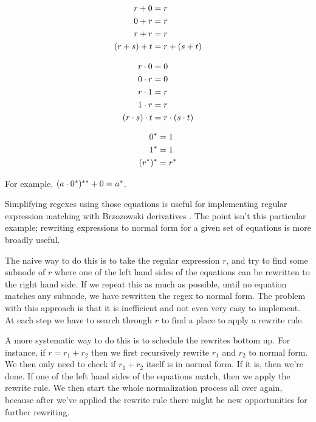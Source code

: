 \begin{minipage}[t]{0.3\textwidth}
  \begin{align*}
    r + 0 &= r \\
    0 + r &= r \\
    r + r &= r \\
    (r + s) + t &= r + (s + t) \\
  \end{align*}
\end{minipage}
\begin{minipage}[t]{0.3\textwidth}
  \begin{align*}
    r \cdot 0 &= 0 \\
    0 \cdot r &= 0 \\
    r \cdot 1 &= r \\
    1 \cdot r &= r \\
    (r \cdot s) \cdot t &= r \cdot (s \cdot t) \\
  \end{align*}
\end{minipage}
\begin{minipage}[t]{0.3\textwidth}
  \begin{align*}
    0^* &= 1 \\
    1^* &= 1 \\
    (r^*)^* &= r^*
  \end{align*}
\end{minipage}

For example, $(a \cdot 0^*)^{**} + 0 = a^*$.

Simplifying regexes using those equations is useful for implementing regular expression matching with Brzozowski derivatives \cite{brzozowski64,owens_reppy_turon_2009}.
The point isn't this particular example; rewriting expressions to normal form for a given set of equations is more broadly useful.

The naive way to do this is to take the regular expression $r$, and try to find some subnode of $r$ where one of the left hand sides of the equations can be rewritten to the right hand side.
If we repeat this as much as possible, until no equation matches any subnode, we have rewritten the regex to normal form.
The problem with this approach is that it is inefficient and not even very easy to implement. At each step we have to search through $r$ to find a place to apply a rewrite rule.

A more systematic way to do this is to schedule the rewrites bottom up. For instance, if $r = r_1 + r_2$ then we first recursively rewrite $r_1$ and $r_2$ to normal form. We then only need to check if $r_1 + r_2$ itself is in normal form. If it is, then we're done. If one of the left hand sides of the equations match, then we apply the rewrite rule. We then start the whole normalization process all over again, because after we've applied the rewrite rule there might be new opportunities for further rewriting.


